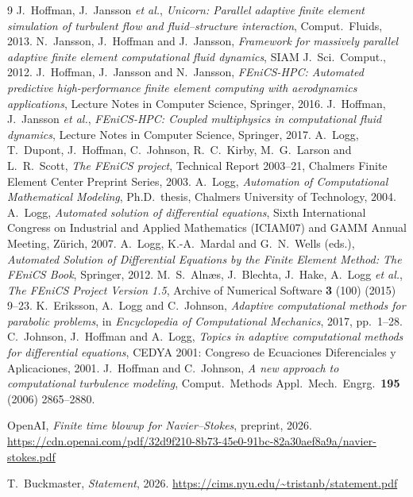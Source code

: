 \documentclass[11pt]{article}
\begin{document}
\begin{thebibliography}{9}
 J.~Hoffman, J.~Jansson \emph{et al.}, \emph{Unicorn: Parallel adaptive finite
  element simulation of turbulent flow and fluid--structure interaction}, Comput.\ Fluids, 2013.
 N.~Jansson, J.~Hoffman and J.~Jansson, \emph{Framework for massively parallel
  adaptive finite element computational fluid dynamics}, SIAM J.\ Sci.\ Comput., 2012.
 J.~Hoffman, J.~Jansson and N.~Jansson, \emph{FEniCS-HPC: Automated predictive
  high-performance finite element computing with aerodynamics applications}, Lecture Notes in
  Computer Science, Springer, 2016.
 J.~Hoffman, J.~Jansson \emph{et al.}, \emph{FEniCS-HPC: Coupled multiphysics
  in computational fluid dynamics}, Lecture Notes in Computer Science, Springer, 2017.
 A.~Logg, T.~Dupont, J.~Hoffman, C.~Johnson, R.~C.~Kirby, M.~G.~Larson and
  L.~R.~Scott, \emph{The FEniCS project}, Technical Report 2003--21, Chalmers Finite Element Center
  Preprint Series, 2003.
 A.~Logg, \emph{Automation of Computational Mathematical Modeling}, Ph.D.\ thesis,
  Chalmers University of Technology, 2004.
 A.~Logg, \emph{Automated solution of differential equations}, Sixth International
  Congress on Industrial and Applied Mathematics (ICIAM07) and GAMM Annual Meeting, Z\"urich, 2007.
 A.~Logg, K.-A.~Mardal and G.~N.~Wells (eds.), \emph{Automated Solution of
  Differential Equations by the Finite Element Method: The FEniCS Book}, Springer, 2012.
 M.~S.~Aln\ae s, J.~Blechta, J.~Hake, A.~Logg \emph{et al.}, \emph{The FEniCS
  Project Version 1.5}, Archive of Numerical Software \textbf{3} (100) (2015) 9--23.
 K.~Eriksson, A.~Logg and C.~Johnson, \emph{Adaptive computational methods for
  parabolic problems}, in \emph{Encyclopedia of Computational Mechanics}, 2017, pp.~1--28.
 C.~Johnson, J.~Hoffman and A.~Logg, \emph{Topics in adaptive computational methods
  for differential equations}, CEDYA 2001: Congreso de Ecuaciones Diferenciales y Aplicaciones, 2001.
 J.~Hoffman and C.~Johnson, \emph{A new approach to computational turbulence
modeling}, Comput.\ Methods Appl.\ Mech.\ Engrg.\ \textbf{195} (2006) 2865--2880.

 OpenAI, \emph{Finite time blowup for Navier--Stokes}, preprint, 2026.
\newblock \url{https://cdn.openai.com/pdf/32d9f210-8b73-45e0-91bc-82a30aef8a9a/navier-stokes.pdf}

 T.~Buckmaster, \emph{Statement}, 2026.
\newblock \url{https://cims.nyu.edu/~tristanb/statement.pdf}


\end{thebibliography}
\end{document}
